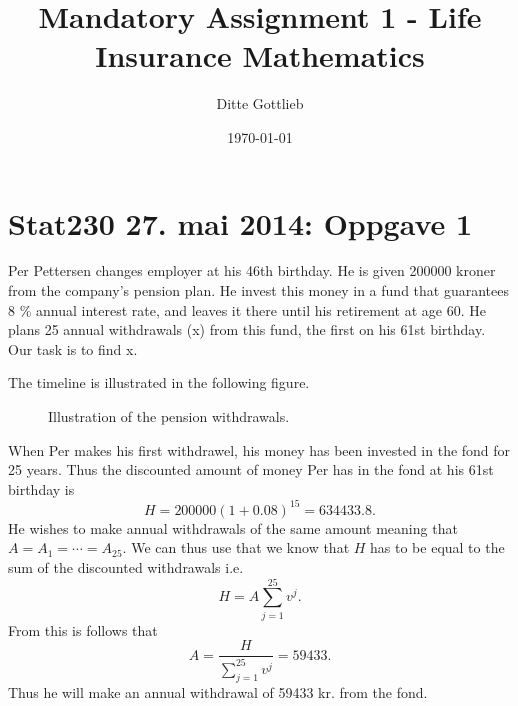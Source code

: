 \documentclass[a4paper,colorinlistoftodos, 10pt]{article}
\title{Mandatory Assignment 1 - Life Insurance Mathematics}
\author{Ditte Gottlieb}
\date{\today}
\begin{document}
\maketitle

\section*{Stat230 27. mai 2014: Oppgave 1}

Per Pettersen changes employer at his 46th birthday. He is given 200000 kroner from
the company’s pension plan. He invest this money in a fund that guarantees 8 \% annual
interest rate, and leaves it there until his retirement at age 60. He plans 25 annual
withdrawals (x) from this fund, the first on his 61st birthday. Our task is to find x.\newline

\noindent The timeline is illustrated in the following figure.
\begin{figure}[ht]
\centering
{}
\caption{Illustration of the pension withdrawals.}
\end{figure}

\noindent When Per makes his first withdrawel, his money has been invested in the fond for 25 years. Thus the discounted amount of money Per has in the fond at his 61st birthday is
\begin{equation*}
    H = 200000 (1 + 0.08)^{15} = 634433.8.
\end{equation*}
He wishes to make annual withdrawals of the same amount meaning that $A = A_1 = \cdots = A_{25}$. We can thus use that we know that $H$ has to be equal to the sum of the discounted withdrawals i.e.
\begin{equation*}
    H = A\sum_{j=1}^{25} v^j.
\end{equation*}
From this is follows that 
\begin{equation*}
    A = \frac{H}{\sum_{j=1}^{25} v^j} = 59433.
\end{equation*}
Thus he will make an annual withdrawal of 59433 kr. from the fond.
\end{document}
